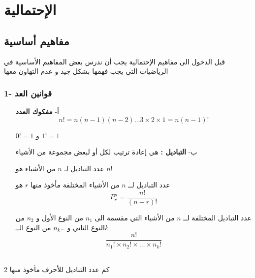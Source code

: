\chapter[الإحتمالية]{الإحتمالية }

\section{مفاهيم أساسية}

قبل الدخول الى مفاهيم الإحتمالية يجب أن ندرس بعض المفاهيم الأساسية في الرياضيات التي يجب فهمها بشكل جيد و عدم التهاون معها

\subsection*{1- قوانين العد}

\begin{enumerate}
	
	\item[أ-] \textbf{مفكوك العدد }
\[
n ! = n(n-1)(n-2) \dots 3 \times 2 \times 1 = n (n-1)!
\]
\begin{note}
	\(0!=1\) و \(1!=1\)
\end{note}

    \item[ب-] \textbf{التباديل :}   هي إعادة ترتيب لكل أو لبعض مجموعة من الأشياء
\begin{note}
عدد التباديل لـ \(n\) من الأشياء هو \(\boxed{n!}\)
\end{note}

\begin{note}
	عدد التباديل لــ \(n\) من الأشياء المختلفة مأخوذ منها \(r\) هو 
	\[
	P^n_r = \frac{n!}{(n-r)!}
	\]
\end{note}

\begin{note}
	عدد التباديل المختلفة لــ \(n\) من الأشياء التي مقسمة الى \(n_1\) من النوع الأول و \(n_2\) من النوع الثاني و \dots \(n_k\) من النوع الــ\(k\)
	\[
	\frac{n!}{n_1!\times n_2!\times \dots \times n_k!}
	\]
\end{note}

\end{enumerate}

	\begin{example}
		\\
		كم عدد التباديل للأحرف  مأخوذ منها 2
	\end{example}
	
